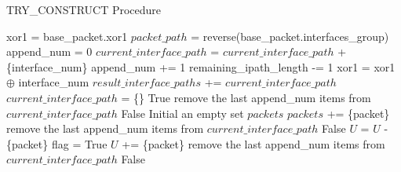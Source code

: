 \begin{algorithm}[htbp]
    \small
    \caption{TRY\_CONSTRUCT Procedure}
    \begin{algorithmic}[1] %
        \State xor1 = base\_packet.xor1 
        \State $packet\_path$ = reverse(base\_packet.interfaces\_group) 
        \State append\_num = 0
            \State  $current\_interface\_path$ = $current\_interface\_path$ + \{interface\_num\}
            \State append\_num += 1
            \State remaining\_ipath\_length -= 1
            \State xor1 = xor1 $\oplus$ interface\_num
            \EndIf
        \EndFor
                \State $result\_interface\_paths$ +=  $current\_interface\_path$
                \State $current\_interface\_path$ = \{\}
                \State \Return True
            \Else
                \State remove the last append\_num items from $current\_interface\_path$
                \State \Return False
            \EndIf
        \Else 
            \State Initial an empty set $packets$
                    \State $packets$ += \{packet\}
                \EndIf
            \EndFor
                \State remove the last append\_num items from $current\_interface\_path$
                \State \Return False
            \Else
                    \State $U$ = $U$ - \{packet\}
                    \State flag =  
                    \State \Return True
                    \Else
                        \State $U$ += \{packet\}
                    \EndIf
                \EndFor
                \State remove the last append\_num items from $current\_interface\_path$
                \State \Return False
            \EndIf
        \EndIf
        \EndProcedure 
    \end{algorithmic}
    \label{alg:try_construct}
\end{algorithm}
